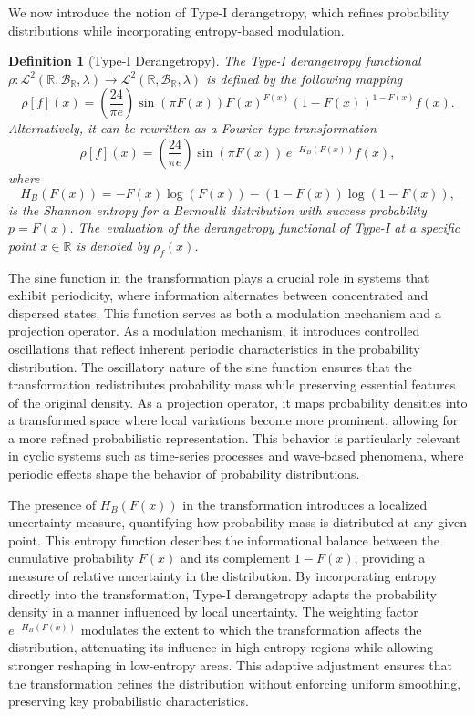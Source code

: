 \documentclass[sn-mathphys-num]{sn-jnl}%
\theoremstyle{thmstyleone}%
\theoremstyle{thmstyletwo}%
\theoremstyle{thmstylethree}%
\newtheorem{definition}{Definition}%
\begin{document}
We now introduce the notion of Type-I derangetropy, which refines probability distributions while incorporating entropy-based modulation.
\begin{definition}[Type-I Derangetropy]
	\label{Def:TypeI}
	The \textit{Type-I derangetropy functional} $\rho: \mathcal{L}^2(\mathbb{R}, \mathscr{B}_{\mathbb{R}}, \lambda) \rightarrow \mathcal{L}^2(\mathbb{R}, \mathscr{B}_{\mathbb{R}}, \lambda)$ is defined by the following mapping
	\begin{equation}
		\rho[f](x) = \left(\frac{24}{\pi e}\right) \sin(\pi F(x)) F(x)^{F(x)} (1-F(x))^{1-F(x)}  f(x).
	\end{equation}
	Alternatively, it can be rewritten as a Fourier-type transformation
	\begin{equation}
		\rho[f](x) = \left(\frac{24}{\pi e}\right) \sin(\pi F(x))\,  e^{-H_B(F(x))} f(x),
	\end{equation}
	where
	\begin{equation}
		H_B(F(x)) = -F(x) \log (F(x)) - (1-F(x)) \log (1-F(x)),
	\end{equation}
	is the \textit{Shannon entropy} for a Bernoulli distribution with success probability $p = F(x)$. The~evaluation of the derangetropy functional of Type-I at a specific point $x \in \mathbb{R}$ is denoted by $\rho_f(x)$.
\end{definition}

The sine function in the transformation plays a crucial role in systems that exhibit periodicity, where information alternates between concentrated and dispersed states. This function serves as both a modulation mechanism and a projection operator. As a modulation mechanism, it introduces controlled oscillations that reflect inherent periodic characteristics in the probability distribution. The oscillatory nature of the sine function ensures that the transformation redistributes probability mass while preserving essential features of the original density. As a projection operator, it maps probability densities into a transformed space where local variations become more prominent, allowing for a more refined probabilistic representation. This behavior is particularly relevant in cyclic systems such as time-series processes and wave-based phenomena, where periodic effects shape the behavior of probability distributions.

The presence of $H_B(F(x))$ in the transformation introduces a localized uncertainty measure, quantifying how probability mass is distributed at any given point. This entropy function describes the informational balance between the cumulative probability $F(x)$ and its complement $1-F(x)$, providing a measure of relative uncertainty in the distribution. By incorporating entropy directly into the transformation, Type-I derangetropy adapts the probability density in a manner influenced by local uncertainty. The weighting factor $e^{-H_B(F(x))}$ modulates the extent to which the transformation affects the distribution, attenuating its influence in high-entropy regions while allowing stronger reshaping in low-entropy areas. This adaptive adjustment ensures that the transformation refines the distribution without enforcing uniform smoothing, preserving key probabilistic characteristics.
\end{document}
